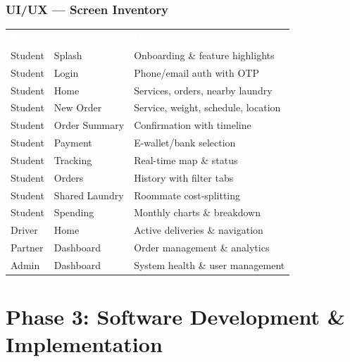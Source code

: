 \documentclass[aspectratio=169,professionalfonts,10pt]{beamer}
\begin{document}
\begin{frame}
    \frametitle{UI/UX --- Screen Inventory}
    \scriptsize
    \begin{table}
        \centering
        \begin{tabular}{lll}
            \rowcolor{ugmBlue!40}
            \textcolor{white}{\textbf{Role}} & \textcolor{white}{\textbf{Screen}} & \textcolor{white}{\textbf{Purpose}} \\
            Student & Splash & Onboarding \& feature highlights \\
            Student & Login & Phone/email auth with OTP \\
            Student & Home & Services, orders, nearby laundry \\
            Student & New Order & Service, weight, schedule, location \\
            Student & Order Summary & Confirmation with timeline \\
            Student & Payment & E-wallet/bank selection \\
            Student & Tracking & Real-time map \& status \\
            Student & Orders & History with filter tabs \\
            Student & Shared Laundry & Roommate cost-splitting \\
            Student & Spending & Monthly charts \& breakdown \\
            Driver & Home & Active deliveries \& navigation \\
            Partner & Dashboard & Order management \& analytics \\
            Admin & Dashboard & System health \& user management \\
        \end{tabular}
    \end{table}
\end{frame}

\section{Phase 3: Software Development \& Implementation}
\end{document}
